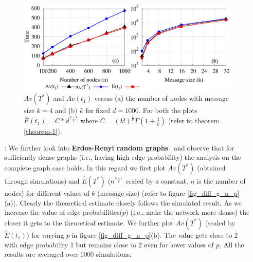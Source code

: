  \begin{figure}[htbp] 
 \centering
 \includegraphics[scale=0.4]{./texfiles/Chapter_3/epl/figs1/plot_var_n_k_complete.eps}
 
 \caption{$Av(T^*)$ and $Av(t_1)$ versus (a) the number of nodes with message size $k=4$ and (b) $k$ for fixed $d=1000$.
  For both the plots $\hat E(t_1) = C \ast d^{\frac{k-1}{k}}$ where $C = (k!)^{\frac{1}{k}}\Gamma\left(1+\frac{1}{k}\right)$ (refer to theorem \ref{theorem-1}).}
 \label{segSizeVsDelay_nrTrans_varyN_Mall_push_pull}
 \end{figure}



: We further look into {\bf Erdos-Renyi random graphs}~\cite{erdos1959random} and observe that for sufficiently 
dense graphs (i.e., having high edge probability) the analysis on the complete graph case holds.  
In this regard we first plot $Av(T^{\ast})$ (obtained through simulations) and $\hat{E}(T^{\ast})$ ($n^{\frac{k-1}{k}}$ scaled by a constant, $n$ is the number of nodes) for 
different values of $k$ (message size) (refer to figure \ref{fig_diff_g_n_p}(a)). 
Clearly the theoretical estimate closely follows the simulated result. {As we increase the value of edge probabilities($p$) (i.e., make the network more dense)
 the closer it gets to the theoretical estimate.}
We further plot $Av(T^{\ast})$ (scaled by $\hat{E}(t_{1})$) for varying $p$ in figure \ref{fig_diff_g_n_p}(b). 
The value gets close to 2 with edge probability 1 but remains close to 2 even for lower values of $p$. 
All the results are averaged over $1000$ simulations.



